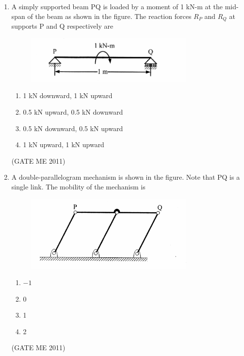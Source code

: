 \documentclass[journal]{IEEEtran}
\begin{document}
\begin{enumerate}
\item A simply supported beam PQ is loaded by a moment of 1 kN-m at the mid-span of the beam as shown in the figure. The reaction forces $R_P$ and $R_Q$ at supports P and Q respectively are

\begin{figure}[H]
    \centering
    \includegraphics[width=0.8\textwidth]{Fig 1.png}
    \caption{}
    \label{fig:question4}
\end{figure}

\begin{multicols}{2}
\begin{enumerate}
\item 1 kN downward, 1 kN upward  
\item 0.5 kN upward, 0.5 kN downward  
\item 0.5 kN downward, 0.5 kN upward  
\item 1 kN upward, 1 kN upward  
\end{enumerate}
\end{multicols} 
\hfill (GATE ME 2011)              

\item A double-parallelogram mechanism is shown in the figure. Note that PQ is a single link. The mobility of the mechanism is

\begin{figure}[H]
    \centering
    \includegraphics[width=0.8\textwidth]{Fig 2.png}
    \caption{}
    \label{fig:question5}
\end{figure}

\begin{multicols}{4}
\begin{enumerate}
\item $-1$  
\item 0  
\item 1  
\item 2  
\end{enumerate}
\end{multicols}   
\hfill (GATE ME 2011)                 


\end{enumerate}
\end{document}
